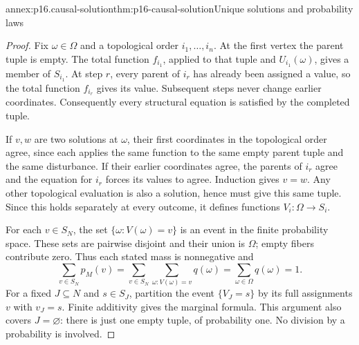 \begin{annexitem}{annex:p16.causal-solution}{thm:p16-causal-solution}{Unique solutions and probability laws}
\begin{proof}
Fix \(\omega\in\Omega\) and a topological order
\(i_1,\ldots,i_n\). At the first vertex the parent tuple is empty.
The total function \(f_{i_1}\), applied to that tuple and
\(U_{i_1}(\omega)\), gives a member of \(S_{i_1}\). At step
\(r\), every parent of \(i_r\) has already been assigned a value,
so the total function \(f_{i_r}\) gives its value. Subsequent steps
never change earlier coordinates. Consequently every structural equation
is satisfied by the completed tuple.

If \(v,w\) are two solutions at \(\omega\), their first
coordinates in the topological order agree, since each applies the same
function to the same empty parent tuple and the same disturbance. If their
earlier coordinates agree, the parents of \(i_r\) agree and the
equation for \(i_r\) forces its values to agree. Induction gives
\(v=w\). Any other topological evaluation is also a solution, hence
must give this same tuple. Since this holds separately at every outcome,
it defines functions \(V_i:\Omega\to S_i\).

For each \(v\in S_N\), the set \(\{\omega:V(\omega)=v\}\)
is an event in the finite probability space. These sets are pairwise
disjoint and their union is \(\Omega\); empty fibers contribute zero.
Thus each stated mass is nonnegative and
\[
 \sum_{v\in S_N}p_M(v)
 =\sum_{v\in S_N}\sum_{\omega:V(\omega)=v}q(\omega)
 =\sum_{\omega\in\Omega}q(\omega)=1.
\]
For a fixed \(J\subseteq N\) and \(s\in S_J\), partition the
event \(\{V_J=s\}\) by its full assignments \(v\) with
\(v_J=s\). Finite additivity gives the marginal formula. This
argument also covers \(J=\varnothing\): there is just one empty
tuple, of probability one. No division by a probability is involved.
\end{proof}
\end{annexitem}

